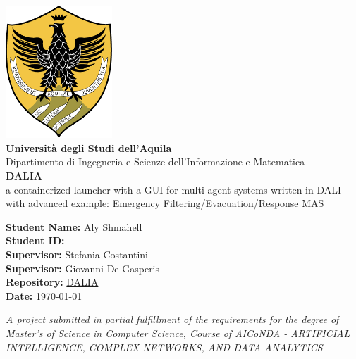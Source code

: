 \documentclass[12pt,a4paper]{article}
\begin{document}
\begin{titlepage}
    \begin{center}
        \includegraphics[width=4cm]{./UnivaqLogo.png} \\[1.5cm]
        
        {\Large \textbf{Università degli Studi dell'Aquila}} \\[0.5cm]
        
        {\large Dipartimento di Ingegneria e Scienze dell'Informazione e Matematica} \\[2cm]
        
        {\LARGE \textbf{DALIA}} \\[1.5cm]
        
        {\large a containerized launcher with a GUI for multi-agent-systems written in DALI} \\[1cm]
        {\large with advanced example: Emergency Filtering/Evacuation/Response MAS} \\[2cm]
        
        \begin{center}
            \textbf{Student Name:} Aly Shmahell \\[0.3cm]
            \textbf{Student ID:}  \\[0.3cm]
            \textbf{Supervisor:} Stefania Costantini \\[0.3cm]
            \textbf{Supervisor:} Giovanni De Gasperis \\[0.3cm]
            \textbf{Repository:} \href{https://github.com/AlyShmahell/dalia.git}{DALIA} \\[0.3cm]
            \textbf{Date:} \today
        \end{center}
        
        \vfill
        
        {\large \textit{A project submitted in partial fulfillment of the requirements for the degree of Master's of Science in Computer Science, Course of AICoNDA - ARTIFICIAL INTELLIGENCE, COMPLEX NETWORKS, AND DATA ANALYTICS}}
        
    \end{center}
\end{titlepage}
\end{document}
